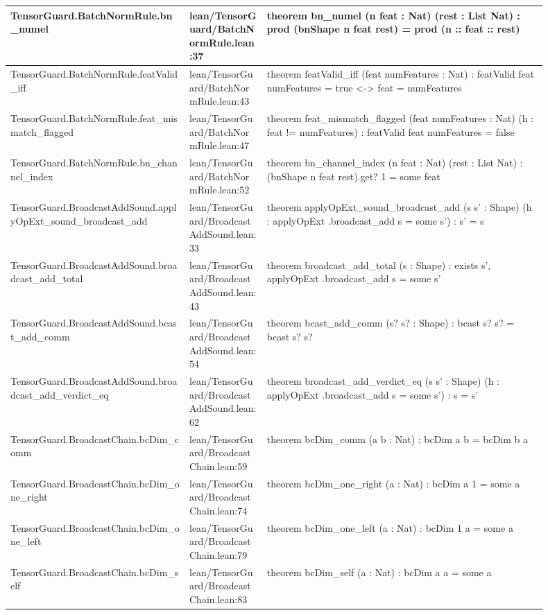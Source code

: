 \documentclass[10pt]{article}
\begin{document}
\begin{longtable}{|p{0.30\linewidth}|p{0.13\linewidth}|p{0.47\linewidth}|}
\hline
TensorGuard.BatchNormRule.bn\_numel & lean/TensorGuard/BatchNormRule.lean:37 & theorem bn\_numel (n feat : Nat) (rest : List Nat) : prod (bnShape n feat rest) = prod (n :: feat :: rest) \\
\hline
TensorGuard.BatchNormRule.featValid\_iff & lean/TensorGuard/BatchNormRule.lean:43 & theorem featValid\_iff (feat numFeatures : Nat) : featValid feat numFeatures = true <-> feat = numFeatures \\
\hline
TensorGuard.BatchNormRule.feat\_mismatch\_flagged & lean/TensorGuard/BatchNormRule.lean:47 & theorem feat\_mismatch\_flagged (feat numFeatures : Nat) (h : feat != numFeatures) : featValid feat numFeatures = false \\
\hline
TensorGuard.BatchNormRule.bn\_channel\_index & lean/TensorGuard/BatchNormRule.lean:52 & theorem bn\_channel\_index (n feat : Nat) (rest : List Nat) : (bnShape n feat rest).get? 1 = some feat \\
\hline
TensorGuard.BroadcastAddSound.applyOpExt\_sound\_broadcast\_add & lean/TensorGuard/BroadcastAddSound.lean:33 & theorem applyOpExt\_sound\_broadcast\_add (s s' : Shape) (h : applyOpExt .broadcast\_add s = some s') : s' = s \\
\hline
TensorGuard.BroadcastAddSound.broadcast\_add\_total & lean/TensorGuard/BroadcastAddSound.lean:43 & theorem broadcast\_add\_total (s : Shape) : exists s', applyOpExt .broadcast\_add s = some s' \\
\hline
TensorGuard.BroadcastAddSound.bcast\_add\_comm & lean/TensorGuard/BroadcastAddSound.lean:54 & theorem bcast\_add\_comm (s? s? : Shape) : bcast s? s? = bcast s? s? \\
\hline
TensorGuard.BroadcastAddSound.broadcast\_add\_verdict\_eq & lean/TensorGuard/BroadcastAddSound.lean:62 & theorem broadcast\_add\_verdict\_eq (s s' : Shape) (h : applyOpExt .broadcast\_add s = some s') : s = s' \\
\hline
TensorGuard.BroadcastChain.bcDim\_comm & lean/TensorGuard/BroadcastChain.lean:59 & theorem bcDim\_comm (a b : Nat) : bcDim a b = bcDim b a \\
\hline
TensorGuard.BroadcastChain.bcDim\_one\_right & lean/TensorGuard/BroadcastChain.lean:74 & theorem bcDim\_one\_right (a : Nat) : bcDim a 1 = some a \\
\hline
TensorGuard.BroadcastChain.bcDim\_one\_left & lean/TensorGuard/BroadcastChain.lean:79 & theorem bcDim\_one\_left (a : Nat) : bcDim 1 a = some a \\
\hline
TensorGuard.BroadcastChain.bcDim\_self & lean/TensorGuard/BroadcastChain.lean:83 & theorem bcDim\_self (a : Nat) : bcDim a a = some a \\

\end{longtable}
\end{document}
